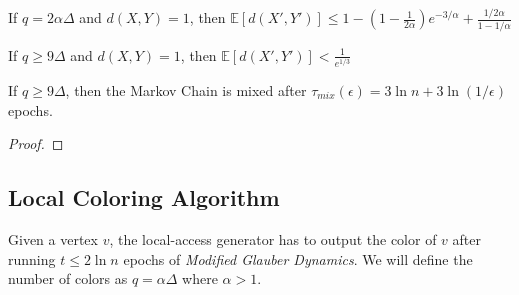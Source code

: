 \begin{lemma}
\label{lem:mohsen_single_epoch_distance}
If $q = 2\alpha\Delta$ and $d(X, Y) = 1$, then $\mathbb E[d(X',Y')] \le 1-\left( 1-\frac1{2\alpha}\right)e^{-3/\alpha} + \frac{1/2\alpha}{1-1/\alpha}$
\end{lemma}
\begin{corollary}
\label{cor:single_epoch_distansce}
If $q \ge 9\Delta$ and $d(X, Y) = 1$, then $\mathbb E[d(X',Y')] < \frac1{e^{1/3}}$
\end{corollary}

\begin{theorem}
\label{thm:modified_mixing_time}
If $q\ge 9\Delta$, then the Markov Chain is mixed after $\tau_{mix}(\epsilon) = 3\ln n + 3\ln(1/\epsilon)$ epochs.
\end{theorem}
\begin{proof}
\end{proof}




\subsection{Local Coloring Algorithm}%
\label{sub:local_coloring_algortihm}
Given a vertex $v$, the local-access generator has to output the color of $v$ after running $t \le 2\ln n$ epochs of \emph{Modified Glauber Dynamics}.
We will define the number of colors as $q = \alpha\Delta$ where $\alpha > 1$.



